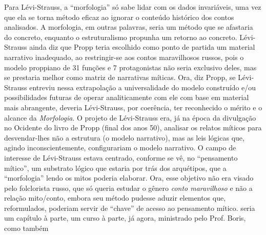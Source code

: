 {  Para Lévi-Strauss, a ``morfologia'' só sabe lidar com os dados
  invariáveis, uma vez que ela se torna método eficaz ao ignorar o
  conteúdo histórico dos contos analisados. A morfologia, em outras
  palavras, seria um método que se afastaria do concreto, enquanto o
  estruturalismo propunha um retorno ao concreto. Lévi-Strauss ainda diz
  que Propp teria escolhido como ponto de partida um material narrativo
  inadequado, ao restringir-se aos contos maravilhosos russos, pois o
  modelo proppiano de 31 funções e 7 protagonistas não seria exclusivo
  deles, mas se prestaria melhor como matriz de narrativas míticas. Ora,
  diz Propp, se Lévi-Strauss entreviu nessa extrapolação a
  universalidade do modelo construído e/ou possibilidades futuras de
  operar analiticamente com ele com base em material mais abrangente,
  deveria Lévi-Strauss, por coerência, ter reconhecido o mérito e o
  alcance da \emph{Morfologia}. O projeto de Lévi-Strauss era, já na
  época da divulgação no Ocidente do livro de Propp (final dos anos 50),
  analisar os relatos míticos para desvendar-lhes não a estrutura (o
  modelo narrativo), mas as leis lógicas que, agindo inconscientemente,
  configurariam o modelo narrativo. O campo de interesse de Lévi-Strauss
  estava centrado, conforme se vê, no ``pensamento mítico'', um
  substrato lógico que estaria por trás dos arquétipos, que a
  ``morfologia'' lendo os mitos poderia elaborar. Ora, esse objetivo não
  era visado pelo folclorista russo, que só queria estudar o gênero
  \emph{conto maravilhoso} e não a relação mito/conto, embora seu método
  pudesse aduzir elementos que, reformulados, poderiam servir de
  ``chave'' de acesso ao pensamento mítico.} seria um capítulo à parte,
um curso à parte, já agora, ministrado pelo Prof. Boris, como também
